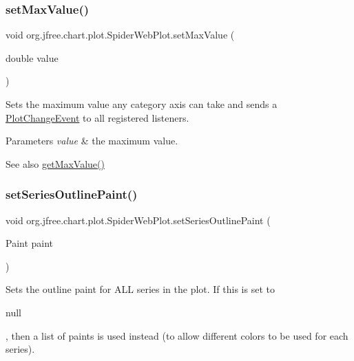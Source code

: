 \subsubsection{\texorpdfstring{set\+Max\+Value()}{setMaxValue()}}
{\footnotesize\ttfamily void org.\+jfree.\+chart.\+plot.\+Spider\+Web\+Plot.\+set\+Max\+Value (\begin{DoxyParamCaption}\item[{double}]{value }\end{DoxyParamCaption})}

Sets the maximum value any category axis can take and sends a \mbox{\hyperlink{}{Plot\+Change\+Event}} to all registered listeners.


\begin{DoxyParams}{Parameters}
{\em value} & the maximum value.\\
\hline
\end{DoxyParams}
\begin{DoxySeeAlso}{See also}
\mbox{\hyperlink{classorg_1_1jfree_1_1chart_1_1plot_1_1_spider_web_plot_a696dc91dc7888409aa37f59e795e95d7}{get\+Max\+Value()}} 
\end{DoxySeeAlso}
\mbox{\label{classorg_1_1jfree_1_1chart_1_1plot_1_1_spider_web_plot_a720b14b880a33b305771cf6413281198}} 
\subsubsection{\texorpdfstring{set\+Series\+Outline\+Paint()}{setSeriesOutlinePaint()}\hspace{0.1cm}{\footnotesize\ttfamily [1/2]}}
{\footnotesize\ttfamily void org.\+jfree.\+chart.\+plot.\+Spider\+Web\+Plot.\+set\+Series\+Outline\+Paint (\begin{DoxyParamCaption}\item[{Paint}]{paint }\end{DoxyParamCaption})}

Sets the outline paint for A\+LL series in the plot. If this is set to 
\begin{DoxyCode}
null 
\end{DoxyCode}
 , then a list of paints is used instead (to allow different colors to be used for each series).


